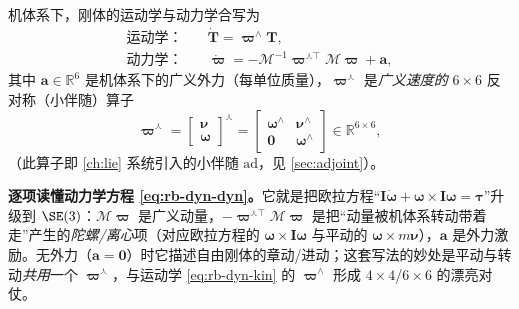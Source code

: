 \begin{theorem}\label{thm:rb-dynamics}
机体系下，刚体的运动学与动力学合写为
\begin{align}
  \text{运动学：}&\quad \dot{\mathbf{T}}=\boldsymbol{\varpi}^\wedge\mathbf{T}, \label{eq:rb-dyn-kin}\\
  \text{动力学：}&\quad \dot{\boldsymbol{\varpi}}=-\boldsymbol{\mathcal{M}}^{-1}\boldsymbol{\varpi}^{\curlywedge\top}\boldsymbol{\mathcal{M}}\boldsymbol{\varpi}+\mathbf{a}, \label{eq:rb-dyn-dyn}
\end{align}
其中 $\mathbf{a}\in\mathbb{R}^6$ 是机体系下的广义外力（每单位质量），$\boldsymbol{\varpi}^\curlywedge$ 是\emph{广义速度的} $6\times6$ 反对称（小伴随）算子
\begin{equation}
  \boldsymbol{\varpi}^\curlywedge=\begin{bmatrix}\boldsymbol{\nu}\\\boldsymbol{\omega}\end{bmatrix}^{\!\curlywedge}=\begin{bmatrix}\boldsymbol{\omega}^\wedge&\boldsymbol{\nu}^\wedge\\\mathbf{0}&\boldsymbol{\omega}^\wedge\end{bmatrix}\in\mathbb{R}^{6\times6},
  \label{eq:rb-curlywedge}
\end{equation}
（此算子即 \cref{ch:lie} 系统引入的小伴随 $\mathrm{ad}$，见 \cref{sec:adjoint}）。
\end{theorem}

\noindent\textbf{逐项读懂动力学方程 \cref{eq:rb-dyn-dyn}。}它就是把欧拉方程“$\mathbf{I}\dot{\boldsymbol{\omega}}+\boldsymbol{\omega}\times\mathbf{I}\boldsymbol{\omega}=\boldsymbol{\tau}$”升级到 $\SE(3)$：$\boldsymbol{\mathcal{M}}\boldsymbol{\varpi}$ 是广义动量，$-\boldsymbol{\varpi}^{\curlywedge\top}\boldsymbol{\mathcal{M}}\boldsymbol{\varpi}$ 是把“动量被机体系转动带着走”产生的\emph{陀螺/离心}项（对应欧拉方程的 $\boldsymbol{\omega}\times\mathbf{I}\boldsymbol{\omega}$ 与平动的 $\boldsymbol{\omega}\times m\boldsymbol{\nu}$），$\mathbf{a}$ 是外力激励。无外力（$\mathbf{a}=\mathbf{0}$）时它描述自由刚体的章动/进动；这套写法的妙处是平动与转动\emph{共用}一个 $\boldsymbol{\varpi}^\curlywedge$，与运动学 \cref{eq:rb-dyn-kin} 的 $\boldsymbol{\varpi}^\wedge$ 形成 $4\times4$/$6\times6$ 的漂亮对仗。

